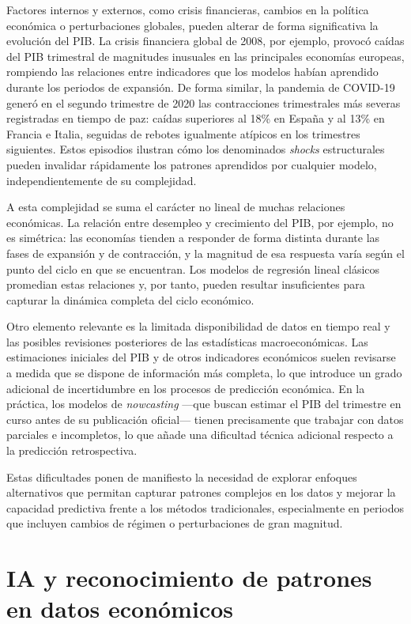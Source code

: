 Factores internos y externos, como crisis financieras, cambios en la política económica o perturbaciones globales, pueden alterar de forma significativa la evolución del PIB. La crisis financiera global de 2008, por ejemplo, provocó caídas del PIB trimestral de magnitudes inusuales en las principales economías europeas, rompiendo las relaciones entre indicadores que los modelos habían aprendido durante los periodos de expansión. De forma similar, la pandemia de COVID-19 generó en el segundo trimestre de 2020 las contracciones trimestrales más severas registradas en tiempo de paz: caídas superiores al 18\% en España y al 13\% en Francia e Italia, seguidas de rebotes igualmente atípicos en los trimestres siguientes. Estos episodios ilustran cómo los denominados \textit{shocks} estructurales pueden invalidar rápidamente los patrones aprendidos por cualquier modelo, independientemente de su complejidad.

A esta complejidad se suma el carácter no lineal de muchas relaciones económicas. La relación entre desempleo y crecimiento del PIB, por ejemplo, no es simétrica: las economías tienden a responder de forma distinta durante las fases de expansión y de contracción, y la magnitud de esa respuesta varía según el punto del ciclo en que se encuentran. Los modelos de regresión lineal clásicos promedian estas relaciones y, por tanto, pueden resultar insuficientes para capturar la dinámica completa del ciclo económico.

Otro elemento relevante es la limitada disponibilidad de datos en tiempo real y las posibles revisiones posteriores de las estadísticas macroeconómicas. Las estimaciones iniciales del PIB y de otros indicadores económicos suelen revisarse a medida que se dispone de información más completa, lo que introduce un grado adicional de incertidumbre en los procesos de predicción económica. En la práctica, los modelos de \textit{nowcasting} ---que buscan estimar el PIB del trimestre en curso antes de su publicación oficial--- tienen precisamente que trabajar con datos parciales e incompletos, lo que añade una dificultad técnica adicional respecto a la predicción retrospectiva.

Estas dificultades ponen de manifiesto la necesidad de explorar enfoques alternativos que permitan capturar patrones complejos en los datos y mejorar la capacidad predictiva frente a los métodos tradicionales, especialmente en periodos que incluyen cambios de régimen o perturbaciones de gran magnitud.

\section{IA y reconocimiento de patrones en datos económicos}

